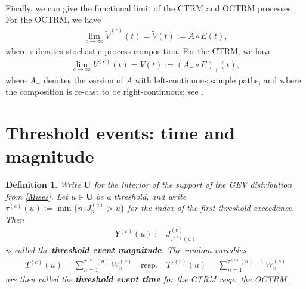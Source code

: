 \documentclass[12pt, a4paper]{article}
\newtheorem{definition}[equation]{Definition}
\newcommand{\1}{\mathbf 1}
\begin{document}
\paragraph{}
Finally, we can give the functional limit of the CTRM and OCTRM processes. 
For the OCTRM, we have 
\begin{align}
  \lim \limits_{c \to \infty} \tilde V^{(c)}(t) = \tilde V(t) 
  := A \circ E(t),
\end{align}
where $\circ$ denotes stochastic process composition. For the CTRM, we have 
\begin{align}
\lim \limits_{c \to \infty} V^{(c)}(t) = V(t) 
:= (A_- \circ E)_+(t),
\end{align}
where $A_-$ denotes the version of $A$ with left-continuous sample paths, and 
where the composition is re-cast to be right-continuous; see \cite{Hees17}. 


\section{Threshold events: time and magnitude}

\begin{definition}
Write $\mathbf U$ for the interior of the support of the GEV distribution from 
\eqref{Mises}. 
Let $u \in \mathbf U$ be a threshold, and write 
$
\tau^{(c)}(u) := \min\{n: J^{(c)}_n > u\}
$
for the index of the first threshold exceedance. 
Then
\begin{align*}
  Y^{(c)}(u) := J^{(c)}_{\tau^{(c)}(u)}
\end{align*}
is called the \textbf{threshold event magnitude}. The random variables 
\begin{align}
  T^{(c)}(u) = \sum_{n=1}^{\tau^{(c)}(u)} W^{(c)}_n \quad \text{resp.} \quad 
  T'^{(c)}(u) = \sum_{n=1}^{\tau^{(c)}(u)-1} W^{(c)}_n
\end{align}
are then called the \textbf{threshold event time} for the CTRM resp.\ the 
OCTRM. 
\end{definition}
\end{document}
